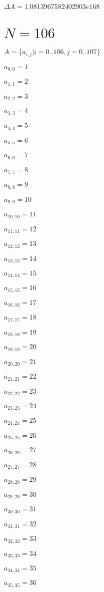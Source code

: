 \documentclass[a4paper,12pt]{article}
\begin{document}
$\Delta A = 1.0813967582402903e168$



\section{ $N = 106$ }
$A = \{ a _{ i, j } | i = \overline { 0..106 }, j = \overline { 0..107 } \}$

$a _{ 0, 0 } = 1$

$a _{ 1, 1 } = 2$

$a _{ 2, 2 } = 3$

$a _{ 3, 3 } = 4$

$a _{ 4, 4 } = 5$

$a _{ 5, 5 } = 6$

$a _{ 6, 6 } = 7$

$a _{ 7, 7 } = 8$

$a _{ 8, 8 } = 9$

$a _{ 9, 9 } = 10$

$a _{ 10, 10 } = 11$

$a _{ 11, 11 } = 12$

$a _{ 12, 12 } = 13$

$a _{ 13, 13 } = 14$

$a _{ 14, 14 } = 15$

$a _{ 15, 15 } = 16$

$a _{ 16, 16 } = 17$

$a _{ 17, 17 } = 18$

$a _{ 18, 18 } = 19$

$a _{ 19, 19 } = 20$

$a _{ 20, 20 } = 21$

$a _{ 21, 21 } = 22$

$a _{ 22, 22 } = 23$

$a _{ 23, 23 } = 24$

$a _{ 24, 24 } = 25$

$a _{ 25, 25 } = 26$

$a _{ 26, 26 } = 27$

$a _{ 27, 27 } = 28$

$a _{ 28, 28 } = 29$

$a _{ 29, 29 } = 30$

$a _{ 30, 30 } = 31$

$a _{ 31, 31 } = 32$

$a _{ 32, 32 } = 33$

$a _{ 33, 33 } = 34$

$a _{ 34, 34 } = 35$

$a _{ 35, 35 } = 36$
\end{document}
